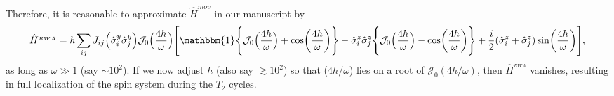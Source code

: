 \documentclass[aps,prb,reprint,showpacs,floatfix,superscriptaddress, onecolumn, nofootinbib, 9pt]{revtex4-2}
\begin{document}
\begin{enumerate}
{    Therefore, it is reasonable to approximate   $\hat{H}^{mov}$ in our manuscript by 
    \begin{align}
		\hat{H}^{_{RWA}} = \hbar\sum_{ij} J_{ij} \Big(\hat{\sigma}^y_i\hat{\sigma}^y_j\Big) \mathcal{J}_0\Big(\frac{4h}{\omega}\Big)\Bigg[\mathbbm{1}\Bigg\{\mathcal{J}_0\Big(\frac{4h}{\omega}\Big) + \cos(\frac{4h}{\omega})\Bigg\} -\hat{\sigma}^z_i\hat{\sigma}^z_j \Bigg\{\mathcal{J}_0\Big(\frac{4h}{\omega}\Big) - \cos(\frac{4h}{\omega})\Bigg\} + \frac{i}{2} (\hat{\sigma}^z_i + \hat{\sigma}^z_j) \sin(\frac{4h}{\omega})\Bigg],
	\end{align}
    as long as $\omega\gg 1$ (say $\sim 10^2$). If we now adjust $h$ (also say $\gtrsim 10^2$) so that ($4h/\omega$) lies on a root of $\mathcal{J}_0(4h/\omega)$, then $\hat{H}^{_{RWA}}$ vanishes, resulting in full localization of the spin system during the $T_2$ cycles.

}
\end{enumerate}
\end{document}
